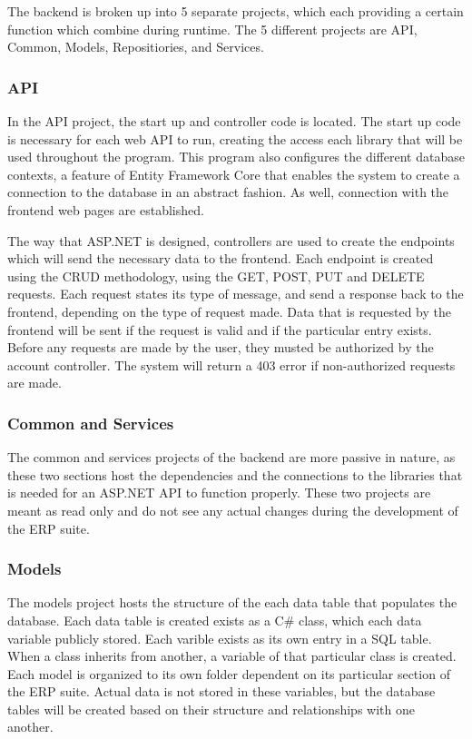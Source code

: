 {{{{{{{{{The backend is broken up into 5 separate projects, which each providing a certain function which combine during runtime. The 5 different projects are API, Common, Models, Repositiories, and Services. 
\newline
{\setlength{\parindent}{0cm}
 
\subsubsection{API}
In the API project, the start up and controller code is located. The start up code is necessary for each web API to run, creating the access each library that will be used throughout the program. This program also configures the different database contexts, a feature of Entity Framework Core that enables the system to create a connection to the database in an abstract fashion. As well, connection with the frontend web pages are established. 
\newline
{\setlength{\parindent}{0cm} 

The way that ASP.NET is designed, controllers are used to create the endpoints which will send the necessary data to the frontend. Each endpoint is created using the CRUD methodology, using the GET, POST, PUT and DELETE requests. Each request states its type of message, and send a response back to the frontend, depending on the type of request made. Data that is requested by the frontend will be sent if the request is valid and if the particular entry exists. Before any requests are made by the user, they musted be authorized by the account controller. The system will return a 403 error if non-authorized requests are made. 

\subsubsection{Common and Services}
The common and services projects of the backend are more passive in nature, as these two sections host the dependencies and the connections to the libraries that is needed for an ASP.NET API to function properly. These two projects are meant as read only and do not see any actual changes during the development of the ERP suite. 

\subsubsection{Models}
The models project hosts the structure of the each data table that populates the database. Each data table is created exists as a C\# class, which each data variable publicly stored. Each varible exists as its own entry in a SQL table. When a class inherits from another, a variable of that particular class is created. Each model is organized to its own folder dependent on its particular section of the ERP suite. Actual data is not stored in these variables, but the database tables will be created based on their structure and relationships with one another.

}}}}}}}}}}}
